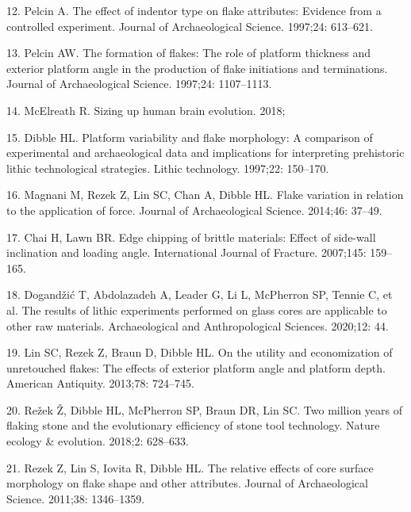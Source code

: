 \documentclass[10pt,letterpaper]{article}
\newenvironment{cslreferences}%
  {}%
  {\par}
\begin{document}
\begin{cslreferences}
\leavevmode\hypertarget{ref-pelcin_effect_1997-1}{}%
12. Pelcin A. The effect of indentor type on flake attributes: Evidence
from a controlled experiment. Journal of Archaeological Science.
1997;24: 613--621.

\leavevmode\hypertarget{ref-pelcin_formation_1997}{}%
13. Pelcin AW. The formation of flakes: The role of platform thickness
and exterior platform angle in the production of flake initiations and
terminations. Journal of Archaeological Science. 1997;24: 1107--1113.

\leavevmode\hypertarget{ref-mcelreath_sizing_2018}{}%
14. McElreath R. Sizing up human brain evolution. 2018;

\leavevmode\hypertarget{ref-dibble_platform_1997}{}%
15. Dibble HL. Platform variability and flake morphology: A comparison
of experimental and archaeological data and implications for
interpreting prehistoric lithic technological strategies. Lithic
technology. 1997;22: 150--170.

\leavevmode\hypertarget{ref-magnani_flake_2014-1}{}%
16. Magnani M, Rezek Z, Lin SC, Chan A, Dibble HL. Flake variation in
relation to the application of force. Journal of Archaeological Science.
2014;46: 37--49.

\leavevmode\hypertarget{ref-chai_edge_2007}{}%
17. Chai H, Lawn BR. Edge chipping of brittle materials: Effect of
side-wall inclination and loading angle. International Journal of
Fracture. 2007;145: 159--165.

\leavevmode\hypertarget{ref-dogandzic_results_2020}{}%
18. Dogandžić T, Abdolazadeh A, Leader G, Li L, McPherron SP, Tennie C,
et al. The results of lithic experiments performed on glass cores are
applicable to other raw materials. Archaeological and Anthropological
Sciences. 2020;12: 44.

\leavevmode\hypertarget{ref-lin_utility_2013-1}{}%
19. Lin SC, Rezek Z, Braun D, Dibble HL. On the utility and
economization of unretouched flakes: The effects of exterior platform
angle and platform depth. American Antiquity. 2013;78: 724--745.

\leavevmode\hypertarget{ref-rezek_two_2018-1}{}%
20. Režek Ž, Dibble HL, McPherron SP, Braun DR, Lin SC. Two million
years of flaking stone and the evolutionary efficiency of stone tool
technology. Nature ecology \& evolution. 2018;2: 628--633.

\leavevmode\hypertarget{ref-rezek_relative_2011-1}{}%
21. Rezek Z, Lin S, Iovita R, Dibble HL. The relative effects of core
surface morphology on flake shape and other attributes. Journal of
Archaeological Science. 2011;38: 1346--1359.


\end{cslreferences}
\end{document}
